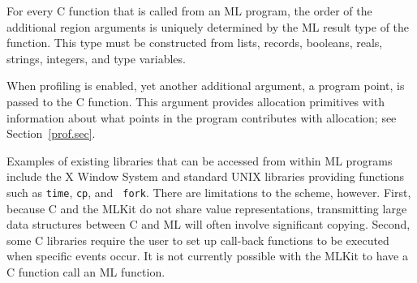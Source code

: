 \documentclass[12pt]{book}
\begin{document}
For every C function that is called from an ML program, the order of the
additional region arguments is uniquely determined by the ML result type
of the function.  This type must be constructed from lists, records,
booleans, reals, strings, integers, and type variables.

When profiling is enabled, yet another additional argument, a program
point, is passed to the C function. This argument provides allocation
primitives with information about what points in the program
contributes with allocation; see Section~\ref{prof.sec}.

Examples of existing libraries that can be accessed from within ML
programs include the X Window System and standard UNIX libraries
providing functions such as {\tt time}, {\tt cp}, and {\tt
fork}. There are limitations to the scheme, however. First, because C
and the MLKit do not share value representations, transmitting large
data structures between C and ML will often involve significant
copying. Second, some C libraries require the user to set up
%
call-back functions to be executed when specific events occur. It is
not currently possible with the MLKit to have a C function call an ML
function.

\end{document}
